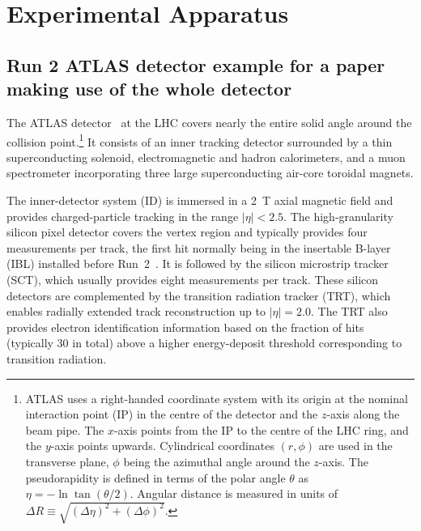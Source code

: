 \chapter{Experimental Apparatus}
\label{chap:experiment}
\newcommand{\AtlasCoordFootnote}{%
ATLAS uses a right-handed coordinate system with its origin at the nominal interaction point (IP)
in the centre of the detector and the \(z\)-axis along the beam pipe.
The \(x\)-axis points from the IP to the centre of the LHC ring,
and the \(y\)-axis points upwards.
Cylindrical coordinates \((r,\phi)\) are used in the transverse plane, 
\(\phi\) being the azimuthal angle around the \(z\)-axis.
The pseudorapidity is defined in terms of the polar angle \(\theta\) as \(\eta = -\ln \tan(\theta/2)\).
Angular distance is measured in units of \(\Delta R \equiv \sqrt{(\Delta\eta)^{2} + (\Delta\phi)^{2}}\).}

\section{Run 2 ATLAS detector example for a paper making use of the whole detector}
\label{sec:atlas2b}

The ATLAS detector~\cite{PERF-2007-01} at the LHC covers nearly the entire solid angle around the collision point.\footnote{\AtlasCoordFootnote}
It consists of an inner tracking detector surrounded by a thin superconducting solenoid, electromagnetic and hadron calorimeters,
and a muon spectrometer incorporating three large superconducting air-core toroidal magnets.

The inner-detector system (ID) is immersed in a \SI{2}{\tesla} axial magnetic field 
and provides charged-particle tracking in the range \(|\eta| < 2.5\).
The high-granularity silicon pixel detector covers the vertex region and typically provides four measurements per track, 
the first hit normally being in the insertable B-layer (IBL) installed before Run~2~\cite{ATLAS-TDR-19,PIX-2018-001}.
It is followed by the silicon microstrip tracker (SCT), which usually provides eight measurements per track.
These silicon detectors are complemented by the transition radiation tracker (TRT),
which enables radially extended track reconstruction up to \(|\eta| = 2.0\). 
The TRT also provides electron identification information 
based on the fraction of hits (typically 30 in total) above a higher energy-deposit threshold corresponding to transition radiation.

